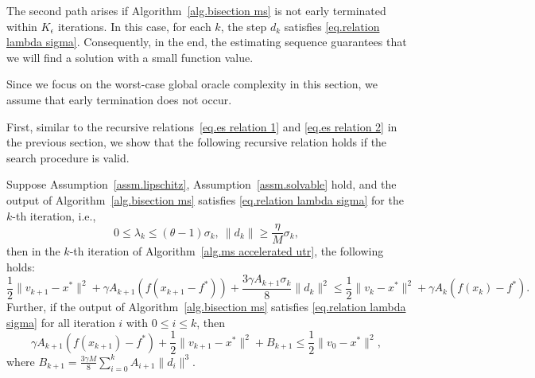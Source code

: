 \documentclass{mcom-l}
\numberwithin{equation}{section}
\begin{document}
The second path arises if Algorithm~\ref{alg.bisection ms} is not early terminated within $K_\epsilon$ iterations. In this case, for each $k$, the step $d_k$ satisfies \eqref{eq.relation lambda sigma}. Consequently, in the end, the estimating sequence guarantees that we will find a solution with a small function value.

Since we focus on the worst-case global oracle complexity in this section, we assume that early termination does not occur.

First, similar to the recursive relations~\eqref{eq.es relation 1} and \eqref{eq.es relation 2} in the previous section, we show that the following recursive relation holds if the search procedure is valid.
\begin{lemma}\label{lem.ms estimate}
    Suppose Assumption~\ref{assm.lipschitz}, Assumption~\ref{assm.solvable} hold, and the output of Algorithm~\ref{alg.bisection ms} satisfies \eqref{eq.relation lambda sigma} for the $k$-th iteration, i.e.,
    \begin{equation*}
        0\leq\lambda_k\leq (\theta-1)\sigma_k, \ \|d_k\|\geq \frac{\eta}{M}\sigma_k,
    \end{equation*}
    then in the $k$-th iteration of Algorithm~\ref{alg.ms accelerated utr}, the following holds:
    \begin{equation}
        \label{eq.helper bounded x}
        \frac{1}{2}\|v_{k+1}-x^* \|^2 +\gamma A_{k+1}\left (f(x_{k+1}-f^*)\right)+ \frac{3\gamma A_{k+1}\sigma_k}{8}\|d_k\|^2 \leq \frac{1}{2}\|v_k-x^*\|^2 +\gamma A_k \left (f(x_k)-f^*\right).
    \end{equation}
    Further, if the output of Algorithm~\ref{alg.bisection ms} satisfies \eqref{eq.relation lambda sigma} for all iteration $i$ with $0\leq i\leq k$, then
    \begin{equation}
        \label{eq.ms estimate advanced}
        \gamma A_{k+1}\left (f(x_{k+1})-f^* \right) + \frac{1}{2}\|v_{k+1}-x^*\|^2 +B_{k+1} \leq \frac{1}{2}\|v_0-x^*\|^2,
    \end{equation}
    where $B_{k+1} = \frac{3\gamma M}{8}\sum_{i=0}^{k}A_{i+1}\|d_i\|^3.$
\end{lemma}
\end{document}
